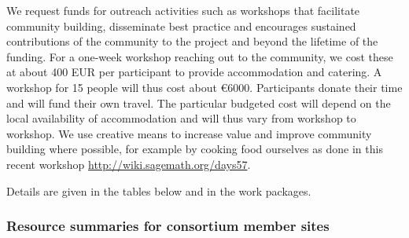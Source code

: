 \label{sect:budget-outreach-workshops}
We request funds for outreach activities such as workshops that
facilitate community building, disseminate best practice and
encourages sustained contributions of the community to the project and
beyond the lifetime of the funding. For  a one-week workshop reaching
out to the community, we cost these at about 400 EUR per participant
to provide accommodation and catering. A workshop for 15 people will
thus cost about \euro{6000}. Participants donate their time and will fund
their own travel. The particular budgeted cost will depend on the
local availability of accommodation and will thus vary from workshop to
workshop. We use creative means to increase value and improve
community building where possible, for example by cooking food
ourselves as done in this recent workshop
\href{http://wiki.sagemath.org/days57}{http://wiki.sagemath.org/days57}.

Details are given in the tables below and in the work packages.

\bigskip

\subsubsection{Resource summaries for consortium member sites}
\label{resources.summary}

